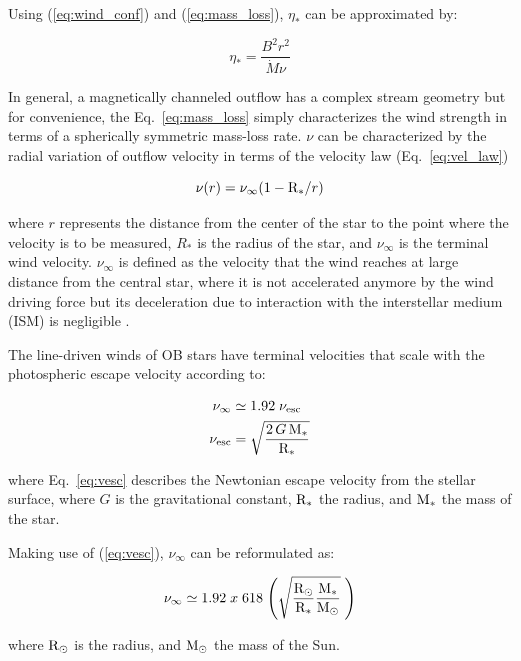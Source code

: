 \documentclass[fleqn,usenatbib]{mnras}
\begin{document}
Using (\ref{eq:wind_conf}) and (\ref{eq:mass_loss}), $\eta_*$ can be approximated by: 
\begin{ceqn}
\begin{equation}
    \eta_* = \frac{B^{2}r^{2}}{\Dot{M}\nu} \label{eq:wind_conf2}
\end{equation}
\end{ceqn}

In general, a magnetically channeled outflow has a complex stream geometry but for convenience, the Eq.~\ref{eq:mass_loss} simply characterizes the wind strength in terms of a spherically symmetric mass-loss rate. $\nu$ can be characterized by the radial variation of outflow velocity in terms of the velocity law (Eq.~\ref{eq:vel_law})
\begin{ceqn}
\begin{equation}
    \nu(r) = \nu_\infty (1-\mathrm{R}_*/r) \label{eq:vel_law}
\end{equation}
\end{ceqn}
where $r$ represents the distance from the center of the star to the point where the velocity is to be measured, $R_*$ is the radius of the star, and $\nu_\infty$ is the terminal wind velocity. $\nu_\infty$ is defined as the velocity that the wind reaches at large distance from the central star, where it is not accelerated anymore by the wind driving force but its deceleration due to interaction with the interstellar medium (ISM) is negligible \citep{Niedzielski2002}.\par

The line-driven winds of OB stars have terminal velocities that scale with the photospheric escape velocity \citep{Lamers2000} according to:
\begin{ceqn}
\begin{align}
    \nu_\infty &\simeq 1.92 \;\nu_{{\rm esc}} \label{eq:vinf}\\
    \nu_{{\rm esc}} &= \sqrt{\frac{2\,G\,\mathrm{M}_*}{\mathrm{R}_*}} \label{eq:vesc}
\end{align}
\end{ceqn}
where Eq.~\ref{eq:vesc} describes the Newtonian escape velocity from the stellar surface, where $G$ is the gravitational constant,   ${\mathrm{R}_*}$ the radius, and ${\mathrm{M}_*}$ the mass of the star.

Making use of (\ref{eq:vesc}), $\nu_\infty$ can be reformulated as:

\begin{ceqn}
\begin{equation}
    \nu_\infty \simeq 1.92 \; x \; 618 \; \Bigg(\sqrt{\frac{\mathrm{R}_\odot}{\mathrm{R}_*}\frac{\mathrm{M}_*}{\mathrm{M}_\odot}} \;\Bigg) \label{eq:vinf}
\end{equation}
\end{ceqn}
where ${\mathrm{R}_\odot}$ is the radius, and ${\mathrm{M}_\odot}$ the mass of the Sun.
\end{document}
